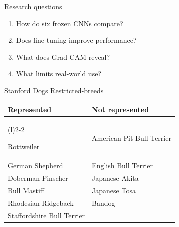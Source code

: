 \documentclass[aspectratio=169,11pt]{beamer}
\newcommand{\stepitem}{\item<+->}
\newcommand{\stepitem}{\item}
\newcommand{\bigbulletlist}{
  \setlength{\itemsep}{0.62em}
  \setlength{\parskip}{0pt}
}
\begin{document}

\begin{frame}{Research questions}

\vspace{-0.3em}

\begin{enumerate}
  \bigbulletlist

  \stepitem How do six frozen CNNs compare?
  \stepitem Does fine-tuning improve performance?
  \stepitem What does Grad-CAM reveal?
  \stepitem What limits real-world use?
\end{enumerate}

\end{frame}


\begin{frame}{Stanford Dogs Restricted-breeds}

\vspace{-0.35em}

\centering

{\fontsize{15.5}{19}\selectfont

\begin{tabularx}{0.92\textwidth}{
  >{\raggedright\arraybackslash}X
  >{\raggedright\arraybackslash}X
}

\textbf{\color{projectblue}Represented}
&
\textbf{\color{projectblue}Not represented}
\\[-0.15em]

\cmidrule(r){1-1}
\cmidrule(l){2-2}

Rottweiler
&
{American Pit Bull Terrier}
\\

\rowcolor{tableStripe}
German Shepherd
&
English Bull Terrier
\\

Doberman Pinscher
&
Japanese Akita
\\

\rowcolor{tableStripe}
Bull Mastiff
&
Japanese Tosa
\\

Rhodesian Ridgeback
&
Bandog
\\

\rowcolor{tableStripe}
Staffordshire Bull Terrier
&
\\

\end{tabularx}
}

\end{frame}
\end{document}
